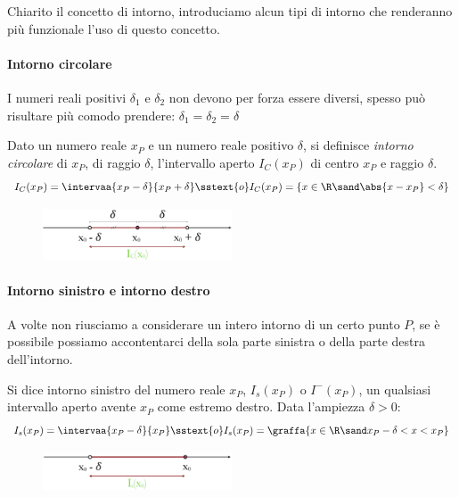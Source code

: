 Chiarito il concetto di intorno, introduciamo alcun tipi di 
intorno che renderanno più funzionale l'uso di questo concetto. 

\paragraph{Intorno circolare} 
I numeri reali positivi \(\delta_1\) e \(\delta_2\) non devono per forza 
essere diversi, spesso può risultare più comodo prendere:
\(\delta_1 = \delta_2 = \delta\)

\begin{newdef}{}{}
Dato un numero reale \(x_P\) e un numero reale positivo \(\delta\), si 
definisce \emph{intorno circolare} di \(x_P\), di raggio \(\delta\), 
l'intervallo aperto \(I_C(x_P)\) di centro \(x_P\) e raggio \(\delta\).
\[I_C(x_P)= \intervaa{x_P-\delta}{x_P+\delta} \sstext{o} 
  I_C(x_P) = \{x \in \R \sand \abs{x-x_P} < \delta\}\]
\end{newdef}

\begin{figure}[h!]
\centering
\includegraphics[width=0.5\textwidth]{img/top_2.png}%
\end{figure}

\paragraph{Intorno sinistro e intorno destro}
A volte non riusciamo a considerare un intero intorno di un certo punto 
\(P\), se è possibile possiamo accontentarci della sola parte sinistra o 
della parte destra dell'intorno.

\begin{newdef}{}{}
Si dice intorno sinistro del numero reale \(x_P\), \(I_s(x_P)\) o 
\(I^-(x_P)\), un qualsiasi intervallo aperto avente \(x_P\) come estremo 
destro. 
Data l'ampiezza \(\delta > 0\):
\[I_s(x_P) = \intervaa{x_P-\delta}{x_P} \sstext{o} 
  I_s(x_P) = \graffa{x \in \R \sand x_P-\delta < x < x_P}\]
\end{newdef}

\begin{figure}[h!]
\centering
\includegraphics[width=0.5\textwidth]{img/top_3.png}%
\end{figure}

